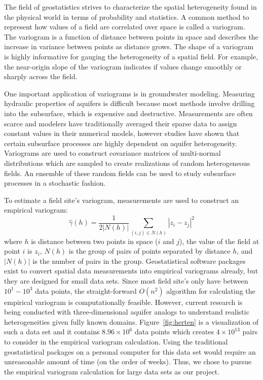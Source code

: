 

The field of geostatistics strives to characterize the spatial heterogeneity found in the physical world in terms of probability and statistics. A common method to represent how values of a field are correlated over space is called a variogram. The variogram is a function of distance between points in space and describes the increase in variance between points as distance grows. The shape of a variogram is highly informative for gauging the heterogeneity of a spatial field. For example, the near-origin slope of the variogram indicates if values change smoothly or sharply across the field. 

One important application of variograms is in groundwater modeling. Measuring hydraulic properties of aquifers is difficult because most methods involve drilling into the subsurface, which is expensive and destructive. Measurements are often scarce and modelers have traditionally averaged their sparse data to assign constant values in their numerical models, however studies have shown that certain subsurface processes are highly dependent on aquifer heterogeneity. Variograms are used to construct covariance matrices of multi-normal distributions which are sampled to create realizations of random heterogeneous fields. An ensemble of these random fields can be used to study subsurface processes in a stochastic fashion.      

To estimate a field site's variogram, measurements are used to construct an empirical variogram: 
\begin{equation} \label{eq:variogram}
\hat{\gamma}(h)=\frac{1}{2|N(h)|}\sum_{(i,j)\in N(h)} |z_i-z_j|^2
\end{equation}
where $h$ is distance between two points in space ($i$ and $j$), the value of the field at point $i$ is $z_i$, $N(h)$ is the group of pairs of points separated by distance $h$, and $|N(h)|$ is the number of pairs in the group. Geostatistical software packages exist to convert spatial data measurements into empirical variograms already, but they are designed for small data sets. Since most field site's only have between $10^1 - 10^3$ data points, the straight-forward $O(n^2)$ algorithm for calculating the empirical variogram is computationally feasible. However, current research is being conducted with three-dimensional aquifer analogs to understand realistic heterogeneities given fully known domains. Figure~\ref{fig:herten} is a visualization of such a data set and it contains $8.96\times 10^6$ data points which creates $4\times 10^{13}$ pairs to consider in the empirical variogram calculation. Using the traditional geostatistical packages on a personal computer for this data set would require an unreasonable amount of time (on the order of weeks). Thus, we chose to pursue the empirical variogram calculation for large data sets as our project.   

